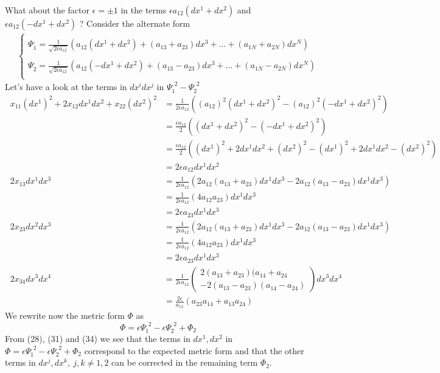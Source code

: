 What about the factor $\epsilon = \pm1$ in the terms $\epsilon a_{12}(dx^1+ dx^2)$ and $\epsilon a_{12}(-dx^1+ dx^2)$ ? Consider the alternate form
\begin{align}
\ &\left \{ \begin{array}{l} \\
\Psi^,_1 = \frac{1}{\sqrt{2 \epsilon a_{12}}}\left( a_{12}(dx^1+ dx^2) + (a_{13}+a_{23})dx^3+ \dots +(a_{1N}+a_{2N})dx^N \right) \\\\
\Psi^,_2 = \frac{1}{\sqrt{2 \epsilon a_{12}}}\left(  a_{12}(- dx^1+ dx^2) + (a_{13}-a_{23})dx^3+ \dots +(a_{1N}-a_{2N})dx^N \right) \\
\end{array}\right.
\end{align}
Let's have a look at the terms in $dx^idx^j$ in $\Psi_1^{,2}-\Psi^{,2}_2$\\
\begin{align}
\ x_{11}(dx^1)^2+ 2x_{12}dx^1dx^2+x_{22}(dx^2)^2&= \frac{1}{2 \epsilon a_{12}}\left(( a_{12})^2(dx^1 + dx^2)^2 - ( a_{12})^2(-dx^1 + dx^2)^2\right)  \\
&= \frac{\epsilon a_{12}}{2}\left((dx^1 +  dx^2)^2 - (- dx^1 + dx^2)^2\right)  \\
&= \frac{\epsilon a_{12}}{2}\left((dx^1)^2 + 2 dx^1dx^2+  (dx^2)^2 - (dx^1)^2 + 2 dx^1dx^2-  (dx^2)^2\right)  \\
&= 2 \epsilon a_{12}dx^1dx^2 \\
\ 2x_{13}dx^1dx^3&= \frac{1}{2 \epsilon a_{12}}(2 a_{12}(a_{13}+a_{23})dx^1dx^3 - 2a_{12}(a_{13}-a_{23})dx^1dx^3) \\
\ &= \frac{1}{2 \epsilon a_{12}}(4 a_{12}a_{23})dx^1dx^3 \\
 & =  2\epsilon a_{23}dx^1dx^3\\
 \ 2x_{23}dx^2dx^3&= \frac{1}{2 \epsilon a_{12}}(2 a_{12}(a_{13}+a_{23})dx^1dx^3 - 2 a_{12}(a_{13}-a_{23})dx^1dx^3) \\
\ &= \frac{1}{2 \epsilon a_{12}}(4 a_{12}a_{23})dx^1dx^3 \\
 & =  2\epsilon a_{23}dx^1dx^3\\
\ 2x_{34}dx^3dx^4&=  \frac{1}{2 \epsilon a_{12}}\left(\begin{array}{l} 2 (a_{13}+ a_{23})(a_{14}+ a_{24}\\ - 2 (a_{13}- a_{23})(a_{14}- a_{24}) \end{array} \right)dx^3dx^4 \\
\ &= \frac{2\epsilon}{ a_{12}}\left(a_{23}a_{14}+a_{13}a_{24}\right)
\end{align}
We rewrite now the metric form $\Phi$ as 
$$\Phi =\epsilon \Psi_1^{,2}- \epsilon \Psi^{,2}_2 + \Phi_2 $$
From (28), (31) and (34) we see that the terms in $dx^1, dx^2$ in $\Phi =\epsilon \Psi_1^{,2}- \epsilon \Psi^{,2}_2 + \Phi_2$ correspond to the expected  metric form and that the other terms in $dx^j, dx^k, \ j,k \neq 1,2$ can be corrected in the remaining term $\Phi_2$.
\newpage

